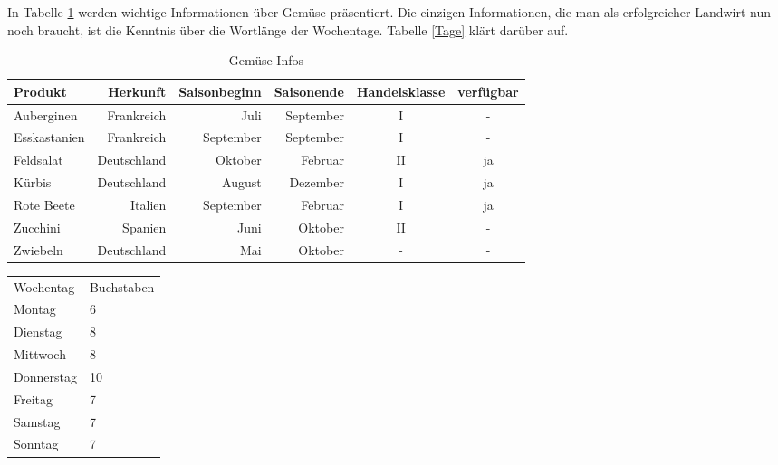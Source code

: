 \documentclass{scrartcl}
\begin{document}
In Tabelle \ref{Gemuse} werden wichtige Informationen über Gemüse präsentiert. Die einzigen Informationen, die man als erfolgreicher Landwirt nun noch braucht, ist die Kenntnis über die Wortlänge der Wochentage. Tabelle \ref{Tage} klärt darüber auf.
\begin{table}[t]
	\begin{tabular}{lrrrcc}
	
	\toprule
	Produkt & Herkunft & Saisonbeginn & Saisonende & Handelsklasse & verfügbar \\ \midrule
	Auberginen & Frankreich & Juli & September & I & - \\
	Esskastanien & Frankreich & September & September & I & - \\
	Feldsalat & Deutschland & Oktober & Februar & II & ja \\
	Kürbis & Deutschland & August & Dezember & I & ja \\
	Rote Beete & Italien & September & Februar & I & ja \\
	Zucchini & Spanien & Juni & Oktober & II & - \\
	Zwiebeln & Deutschland & Mai & Oktober & - & - \\
	\bottomrule
	
	\end{tabular}
\caption{Gemüse-Infos}
\label{Gemuse}
\end{table}

\begin{table}[h]
	\begin{tabular}{|>{\columncolor[gray]{.8}}l|
			>{\color{white}%
				\columncolor[gray]{.2}}l|
}
		Wochentag & Buchstaben\\
		
		Montag & 6\\
		Dienstag & 8\\
		Mittwoch & 8\\
		Donnerstag & 10\\
		Freitag & 7\\
		Samstag & 7\\
		Sonntag & 7\\
	\end{tabular}
\end{table}
\end{document}
